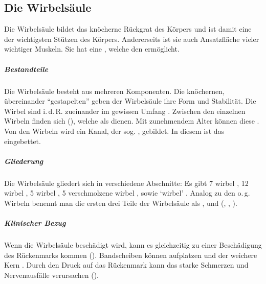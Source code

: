 \clearpage %
\subsection{Die Wirbelsäule}
{%
Die Wirbelsäule bildet das knöcherne Rückgrat des Körpers
und ist damit eine der wichtigsten Stützen des Körpers.
Andererseits ist sie auch Ansatzfläche vieler wichtiger
Muskeln. Sie hat eine ,
welche den  ermöglicht.

\subparagraph{Bestandteile}

Die Wirbelsäule besteht aus mehreren Komponenten. Die
knöchernen, übereinander \protect\enquote{gestapelten} 
 geben der Wirbelsäule ihre Form und
Stabilität. Die Wirbel sind i.\,d.\,R. zueinander im
gewissen Umfang .
Zwischen den einzelnen Wirbeln finden sich 
(), welche als  dienen. Mit
zunehmendem Alter können diese .
Von den Wirbeln wird ein Kanal, der sog. ,
gebildet. In diesem ist das  eingebettet.

\subparagraph{Gliederung} Die Wirbelsäule gliedert sich in
verschiedene Abschnitte: 
Es gibt  7 wirbel ,  12 wirbel 
, 5
wirbel , 5
verschmolzene wirbel , sowie 
\protect\enquote*{wirbel} .
Analog zu den o.\,g. Wirbeln benennt man die ersten drei Teile 
der Wirbelsäule als ,
 und 
(, , ).


\subparagraph{Klinischer Bezug} 
Wenn die Wirbelsäule beschädigt wird, kann es gleichzeitig
zu einer Beschädigung des Rückenmarks kommen
().
Bandscheiben können aufplatzen und der weichere Kern . Durch den Druck auf das
Rückenmark kann das starke Schmerzen und Nervenausfälle
verursachen ().


}
